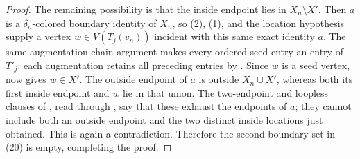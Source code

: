 \begin{proof}
The remaining possibility is that the inside endpoint lies in
\(X_n\setminus X'\).  Then \(a\) is a \(\delta_n\)-colored boundary
identity of \(X_n\), so (2), (1), and the location hypothesis supply a
vertex \(w\in V(T_j(v_n))\) incident with this same exact identity \(a\).
The same augmentation-chain argument makes every ordered seed entry an
entry of \(T'_j\): each augmentation retains all preceding entries by
.  Since \(w\) is a seed vertex,
 now gives \(w\in X'\).  The outside endpoint
of \(a\) is outside
\(X_n\cup X'\), whereas both its first inside endpoint and \(w\) lie in
that union.  The two-endpoint and loopless clauses of
, read through , say that
these exhaust the endpoints of \(a\); they cannot include both an outside
endpoint and the two distinct inside locations just obtained.  This is
again a contradiction.  Therefore the second boundary set in (20) is
empty, completing the proof.
\end{proof}

